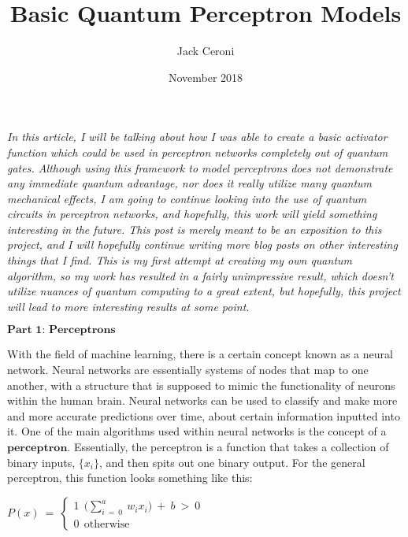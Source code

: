 \documentclass{article}
\title{Basic Quantum Perceptron Models}
\author{Jack Ceroni}
\date{November 2018}
\begin{document}
\maketitle
\textit{
In this article, I will be talking about how I was able to create a basic activator function which could be used in perceptron networks completely out of quantum gates. Although using this framework to model perceptrons does not demonstrate any immediate quantum advantage, nor does it really utilize many quantum mechanical effects, I am going to continue looking into the use of quantum circuits in perceptron networks, and hopefully, this work will yield something interesting in the future. This post is merely meant to be an exposition to this project, and I will hopefully continue writing more blog posts on other interesting things that I find.
\newline\newline
This is my first attempt at creating my own quantum algorithm, so my work has resulted in a fairly unimpressive result, which doesn’t utilize nuances of quantum computing to a great extent, but hopefully, this project will lead to more interesting results at some point.}
\newline\newline
\begin{center}
$\textbf{Part 1: Perceptrons}$
\end{center}
\newline\newline
With the field of machine learning, there is a certain concept known as a neural network. Neural networks are essentially systems of nodes that map to one another, with a structure that is supposed to mimic the functionality of neurons within the human brain. Neural networks can be used to classify and make more and more accurate predictions over time, about certain information inputted into it. One of the main algorithms used within neural networks is the concept of a $\textbf{perceptron}$. Essentially, the perceptron is a function that takes a collection of binary inputs, $\{x_i\}$, and then spits out one binary output. For the general perceptron, this function looks something like this:
\newline
\begin{center}
$P(x) \ = \ \begin{cases} \text{1} \ \ \Big( \displaystyle\sum_{i \ = \ 0}^{a} \ w_{i}x_{i} \Big) \ + \ b \ > \ 0 \\ \text{0} \ \ \text{otherwise} \end{cases}$
\end{center}
\end{document}
